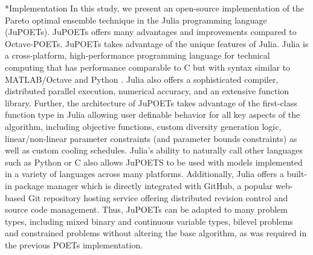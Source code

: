 \documentclass[12pt]{article}
\makeatletter
\renewcommand\section{\@startsection
	{subsection}{2}{0mm}
	{-0.2in}
	{0.05\baselineskip}
	{\normalfont\large\bfseries}}
\makeatother
\begin{document}
\section*{Implementation}
In this study, we present an open-source implementation of the Pareto optimal ensemble technique in the Julia programming language (JuPOETs).
JuPOETs offers many advantages and improvements compared to Octave-POETs.
JuPOETs takes advantage of the unique features of Julia.
Julia is a cross-platform, high-performance programming language for technical computing that has performance comparable to C but with syntax similar to MATLAB/Octave and Python \cite{Julia}. Julia also offers a sophisticated compiler, distributed parallel execution, numerical accuracy, and an extensive function library.
Further, the architecture of JuPOETs takes advantage of the first-class function type in Julia allowing user definable behavior for all key aspects of the algorithm, including objective functions, custom diversity generation logic, linear/non-linear parameter constraints (and parameter bounds constraints) as well as custom cooling schedules.
Julia's ability to naturally call other languages such as Python or C also allows JuPOETS to be used with models implemented in a variety of languages across many platforms.
Additionally, Julia offers a built-in package manager which is directly integrated with GitHub,
a popular web-based Git repository hosting service offering distributed revision control and source code management.
Thus, JuPOETs can be adapted to many problem types, including mixed binary and continuous variable types, bilevel problems and constrained problems without altering the base algorithm, as was required in the previous POETs implementation.
\end{document}
